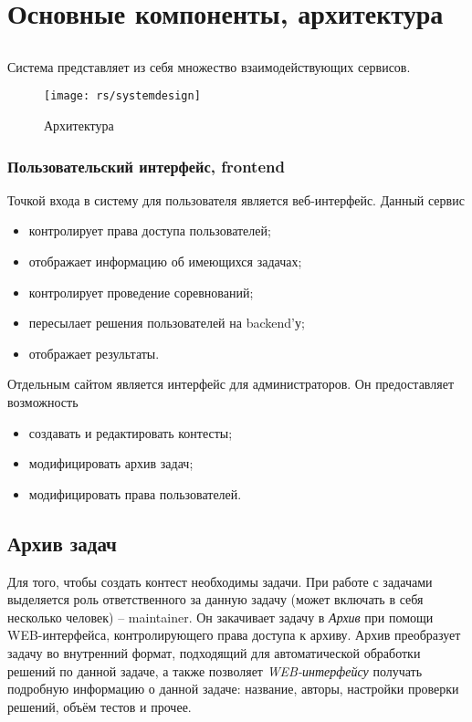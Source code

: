 \chapter{Основные компоненты, архитектура}

\section{}
Система представляет из себя множество взаимодействующих сервисов.

\begin{figure}[H]
\centering
\texttt{[image: rs/systemdesign]}
\label{fig:systemdesign}
\caption{Архитектура}
\end{figure}

\subsection{Пользовательский интерфейс, frontend}
Точкой входа в систему для пользователя является веб-интерфейс.
Данный сервис 
\begin{itemize}
    \item контролирует права доступа пользователей;
    \item отображает информацию об имеющихся задачах;
    \item контролирует проведение соревнований;
    \item пересылает решения пользователей на backend'у;
    \item отображает результаты.
\end{itemize}

Отдельным сайтом является интерфейс для администраторов.
Он предоставляет возможность
\begin{itemize}
    \item создавать и редактировать контесты;
    \item модифицировать архив задач;
    \item модифицировать права пользователей.
\end{itemize}

\section{Архив задач}
Для того, чтобы создать контест необходимы задачи.
При работе с задачами выделяется роль ответственного за данную задачу (может включать в себя
несколько человек) -- maintainer. Он закачивает задачу в \textit{Архив} при помощи WEB-интерфейса,
контролирующего права доступа к архиву. Архив преобразует задачу во внутренний формат,
подходящий для автоматической обработки решений по данной задаче, а также позволяет
\textit{WEB-интерфейсу} получать подробную информацию о данной задаче:
название, авторы, настройки проверки решений, объём тестов и прочее.

